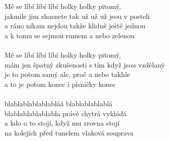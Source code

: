 \clearpage
Mě se líbí líbí líbí holky holky pitomý,\\
jakmile jim zhasnete tak už už už jsou v posteli\\
a ráno nikam nejdou takže klidně ještě jednou\\
a k tomu se sejmou rumem a nebo zelenou\\
\\
Mě se líbí líbí líbí holky holky pitomý,\\
mám jen špatný zkušenosti s tím když jsou vzdělaný\\
je to potom samý ale, proč a nebo takhle\\
a to je potom konec i písničky konec\\
\\
blablablablablabláá blablablablablá\\
blablablablablabla právě chytrá vykládá\\
a kdo o to stojí, když mu zrovna stojí\\
na kolejích před tunelem vlaková souprava \\
